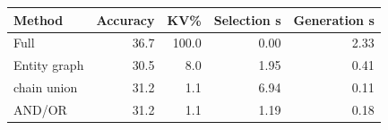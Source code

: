 \begin{tabular}{@{}lrrrr@{}}
\toprule
Method & Accuracy & KV\% & Selection s & Generation s \\
\midrule
Full & 36.7 & 100.0 & 0.00 & 2.33 \\
Entity graph & 30.5 & 8.0 & 1.95 & 0.41 \\
\proofkv{} chain union & 31.2 & 1.1 & 6.94 & 0.11 \\
\proofkv{} AND/OR & 31.2 & 1.1 & 1.19 & 0.18 \\
\bottomrule
\end{tabular}
